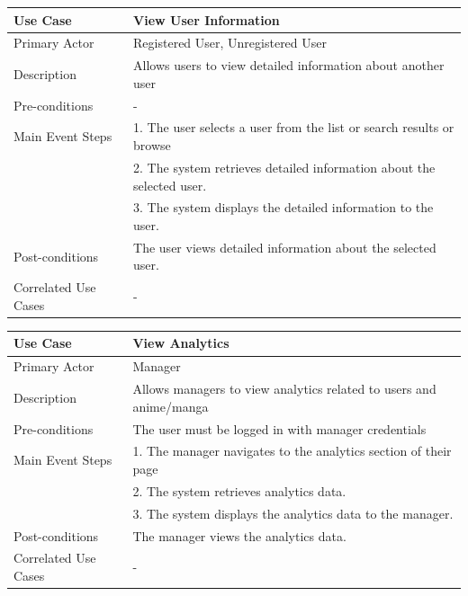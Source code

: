 \begin{longtable}{|p{}|p{}|}
    \hline
    \rowcolor{lightblue}
    \textbf{Use Case} & \textbf{View User Information} \\
    \hline
    Primary Actor & Registered User, Unregistered User\\
    \hline
    Description & Allows users to view detailed information about another user\\
    \hline
    Pre-conditions & -\\
    \hline
    Main Event Steps& 1. The user selects a user from the list or search results or browse \\
    & 2. The system retrieves detailed information about the selected user. \\
    & 3. The system displays the detailed information to the user. \\
    \hline
    Post-conditions &The user views detailed information about the selected user.  \\
    \hline
    Correlated Use Cases & - \\
    \hline
\end{longtable}

\begin{longtable}{|p{}|p{}|}
    \hline
    \rowcolor{lightblue}
    \textbf{Use Case} & \textbf{View Analytics} \\
    \hline
    Primary Actor & Manager \\
    \hline
    Description & Allows managers to view analytics related to users and anime/manga\\
    \hline
    Pre-conditions & The user must be logged in with manager credentials\\
    \hline
    Main Event Steps & 1. The manager navigates to the analytics section of their page \\
    & 2. The system retrieves analytics data. \\
    & 3. The system displays the analytics data to the manager. \\
    \hline
    Post-conditions & The manager views the analytics data.\\
    \hline
    Correlated Use Cases & -\\
    \hline
\end{longtable}

\newpage

